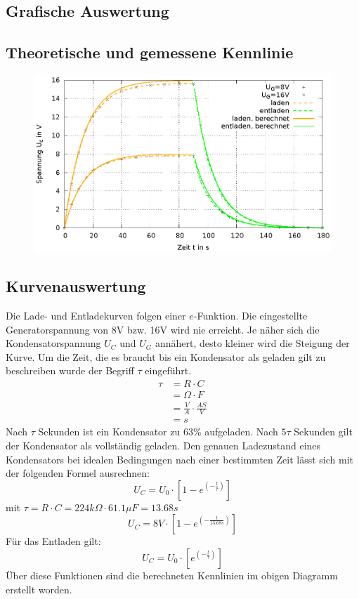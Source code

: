 \documentclass[
a4paper,     %
 headsepline, %
11pt         %
]{scrartcl}  %
\begin{document}
\begin{landscape}

\section{Grafische Auswertung}

\subsection{Theoretische und gemessene Kennlinie}
\begin{figure}[hbtp]
\centering
\includegraphics[scale=1.48]{kennlinie.eps}
\end{figure}

\end{landscape}

\subsection{Kurvenauswertung}
Die Lade- und Entladekurven folgen einer $e$-Funktion. Die eingestellte Generatorspannung von 8V bzw. 16V wird nie erreicht. Je näher sich die Kondensatorspannung $U_C$ und $U_G$ annähert, desto kleiner wird die Steigung der Kurve. Um die Zeit, die es braucht bis ein Kondensator als geladen gilt zu beschreiben wurde der Begriff $\tau$ eingeführt.
\begin{align}
\tau &=R \cdot C \nonumber \\
     &=\Omega \cdot F \nonumber \\
     &=\frac{V}{A} \cdot \frac{AS}{V} \nonumber \\
     &= s \nonumber
\end{align}
Nach $\tau$ Sekunden ist ein Kondensator zu 63\% aufgeladen. Nach $5\tau$ Sekunden gilt der Kondensator als vollständig geladen.\newline
Den genauen Ladezustand eines Kondensators bei idealen Bedingungen nach einer bestimmten Zeit lässt sich mit der folgenden Formel ausrechnen:
\[U_C = U_0 \cdot [1-e^{(-\frac{t}{\tau})}]\]
mit $\tau = R\cdot C = 224k\Omega \cdot 61.1\mu F=13.68s$
\[U_C = 8V \cdot [1-e^{(-\frac{t}{13.68s})}]\]
Für das Entladen gilt:
\[U_C = U_0 \cdot [e^{(-\frac{t}{\tau})}]\]
Über diese Funktionen sind die berechneten Kennlinien im obigen Diagramm erstellt worden.
\end{document}
